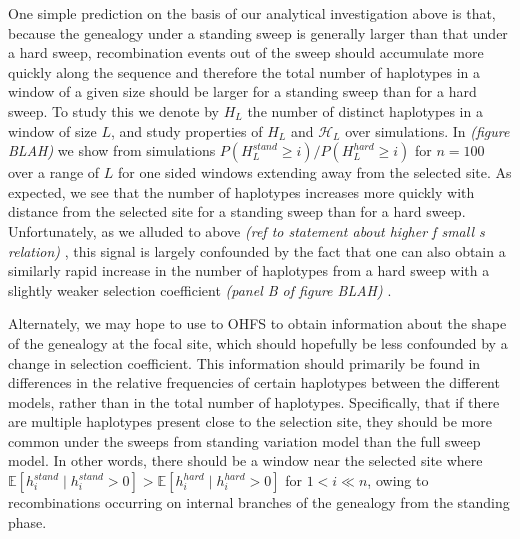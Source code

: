 \documentclass[a4paper,10pt]{article}
\newcommand{\jb}[1]{{\it\color{blue} (#1)} }
\begin{document}
One simple prediction on the basis of our analytical investigation above is that, because the genealogy under a standing sweep is generally larger than that under a hard sweep, recombination events out of the sweep should accumulate more quickly along the sequence and therefore the total number of haplotypes in a window of a given size should be larger for a standing sweep than for a hard sweep. To study this we denote by $H_L$ the number of distinct haplotypes in a window of size $L$, and study properties of $H_L$ and $\mathcal{H}_L$ over simulations.  In \jb{figure BLAH} we show from simulations $P\left(H_L^{stand} \geq i \right)/P\left(H_L^{hard} \geq i \right)$ for $n = 100$ over a range of $L$ for one sided windows extending away from the selected site. As expected, we see that the number of haplotypes increases more quickly with distance from the selected site for a standing sweep than for a hard sweep. Unfortunately, as we alluded to above \jb{ref to statement about higher f small s relation}, this signal is largely confounded by the fact that one can also obtain a similarly rapid increase in the number of haplotypes from a hard sweep with a slightly weaker selection coefficient \jb{panel B of figure BLAH}.

Alternately, we may hope to use to OHFS to obtain information about the shape of the genealogy at the focal site, which should hopefully be less confounded by a change in selection coefficient. This information should primarily be found in differences in the relative frequencies of certain haplotypes between the different models, rather than in the total number of haplotypes. Specifically, that if there are multiple haplotypes present close to the selection site,  they should be more common under the sweeps from standing variation model than the full sweep model. In other words, there should be a window near the selected site where $\mathbb{E}[h_i^{stand} \mid h_i^{stand} > 0] > \mathbb{E}[h_i^{hard} \mid h_i^{hard} > 0]$ for $1 < i \ll n$, owing to recombinations occurring on internal branches of the genealogy from the standing phase. 
\end{document}
